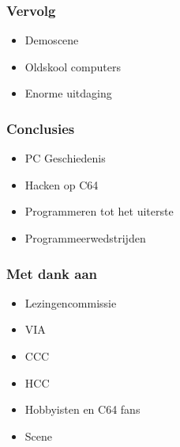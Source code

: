 \documentclass[aspectratio=43]{uva-inf-presentation}
\begin{document}

\begin{frame}
\frametitle{Vervolg}

\begin{itemize}
\item Demoscene
\item Oldskool computers
\item Enorme uitdaging
\end{itemize}

\end{frame}


\begin{frame}
\frametitle{Conclusies}

\begin{itemize}
\item PC Geschiedenis
\item Hacken op C64
\item Programmeren tot het uiterste
\item Programmeerwedstrijden
\end{itemize}

\end{frame}


\begin{frame}
\frametitle{Met dank aan}

\begin{itemize}
\item Lezingencommissie
\item VIA
\item CCC
\item HCC
\item Hobbyisten en C64 fans
\item Scene
\end{itemize}

\end{frame}

\end{document}
